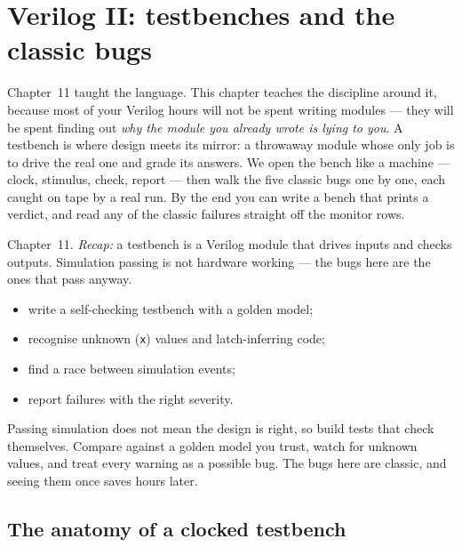 \chapter{Verilog II: testbenches and the classic bugs}\label{ch:verilog2}

Chapter~11 taught the language. This chapter teaches the discipline
around it, because most of your Verilog hours will not be spent writing
modules --- they will be spent finding out \emph{why the module you
already wrote is lying to you}. A testbench is where design meets its
mirror: a throwaway module whose only job is to drive the real one and
grade its answers. We open the bench like a machine --- clock,
stimulus, check, report --- then walk the five classic bugs one by
one, each caught on tape by a real run. By the end you can write a
bench that prints a verdict, and read any of the classic failures
straight off the monitor rows.

\begin{rulebox}
Chapter~11. \emph{Recap:} a testbench is a Verilog module that drives inputs and checks outputs. Simulation passing is not hardware working --- the bugs here are the ones that pass anyway.
\end{rulebox}
\begin{wins}
\begin{itemize}
\item write a self-checking testbench with a golden model;
\item recognise unknown (\texttt{x}) values and latch-inferring code;
\item find a race between simulation events;
\item report failures with the right severity.
\end{itemize}
\end{wins}
\begin{principle}
Passing simulation does not mean the design is right, so build tests that check themselves. Compare against a golden model you trust, watch for unknown values, and treat every warning as a possible bug. The bugs here are classic, and seeing them once saves hours later.
\end{principle}

\section{The anatomy of a clocked testbench}\label{sec:anatomy}

